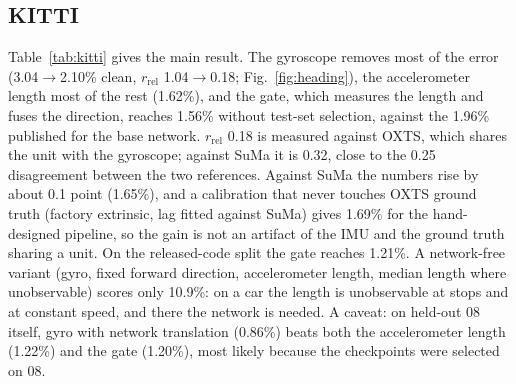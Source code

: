 \documentclass[letterpaper,journal]{IEEEtran}
\begin{document}
\subsection{KITTI}

\begin{table}[t]
\caption{KITTI 05/07/10, $t_\mathrm{rel}$\,\% (mean $\pm$ sd over 3 seeds) / $r_\mathrm{rel}$. Clean: paper-text split, checkpoint selected on held-out 08. With 08: checkpoint selected on the test drives, as in the released code. SuMa: lidar-SLAM reference independent of the IMU; against SuMa, $r_\mathrm{rel}$ is 0.32 for every row with gyro rotation.}
\label{tab:kitti}
\centering\small
\setlength{\tabcolsep}{3pt}
\end{table}

Table~\ref{tab:kitti} gives the main result. The gyroscope removes most of the error (3.04$\to$2.10\% clean, $r_\mathrm{rel}$ 1.04$\to$0.18; Fig.~\ref{fig:heading}), the accelerometer length most of the rest (1.62\%), and the gate, which measures the length and fuses the direction, reaches 1.56\% without test-set selection, against the 1.96\% published for the base network. $r_\mathrm{rel}$ 0.18 is measured against OXTS, which shares the unit with the gyroscope; against SuMa it is 0.32, close to the 0.25 disagreement between the two references. Against SuMa the numbers rise by about 0.1 point (1.65\%), and a calibration that never touches OXTS ground truth (factory extrinsic, lag fitted against SuMa) gives 1.69\% for the hand-designed pipeline, so the gain is not an artifact of the IMU and the ground truth sharing a unit. On the released-code split the gate reaches 1.21\%. A network-free variant (gyro, fixed forward direction, accelerometer length, median length where unobservable) scores only 10.9\%: on a car the length is unobservable at stops and at constant speed, and there the network is needed. A caveat: on held-out 08 itself, gyro with network translation (0.86\%) beats both the accelerometer length (1.22\%) and the gate (1.20\%), most likely because the checkpoints were selected on 08.
\end{document}
